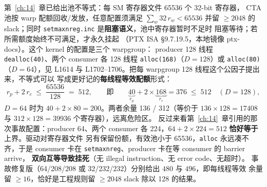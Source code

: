 第~\ref{ch:14}~章已给出池不等式：每 SM 寄存器文件 65536 个 32-bit 寄存器，
CTA 池按 warp 配额回收/发放，任意配置须满足
$\sum_{w} 32\,r_w < 65536$ 并留 $\ge 2048$ 的 slack；同时
\texttt{setmaxnreg.\allowbreak{}inc} 是\textbf{阻塞语义}，池中寄存器暂时不足时
阻塞等待；若所需额度始终不可满足，才永久挂起
（PTX ISA §9.7.19.5，本地镜像 ptx-docs）。这个 kernel 的配置是三个 warpgroup：
producer 128 线程 \texttt{dealloc(40)}、两个 consumer 各 128 线程
\texttt{alloc(168)}（$D{=}128$）或 \texttt{alloc(80)}（$D{=}64$），见
L1614 与 L1702--1706。把每 warpgroup 128 线程这个公因子提出来，不等式可以
写成更好记的\textbf{每线程等效配额}形式：
\begin{equation}
  r_p + 2\,r_c \;\le\; \frac{65536}{128} \;=\; 512 ,
  \qquad\text{即}\qquad
  \underbrace{40}_{r_p} + 2 \times \underbrace{168}_{r_c} = 376 \;\le\; 512
  \quad (D{=}128) ,
  \label{eq:18-pool}
\end{equation}
$D{=}64$ 时为 $40 + 2 \times 80 = 200$。两者余量 136 / 312（等价于
$136 \times 128 = 17408$ 与 $312 \times 128 = 39936$ 个寄存器），远离危险区。
反过来看第~\ref{ch:14}~章引用的那次事故配置：producer 64、两个 consumer
各 224，$64 + 2 \times 224 = 512$ \textbf{恰好等于}上界。驱动对寄存器文件
另有保留份额，有效池小于 65536，\texttt{alloc} 永远凑不齐，于是 consumer
卡在 \texttt{setmaxnreg}、producer 卡在等 consumer 的 barrier arrive，
\textbf{双向互等导致挂死}（无 illegal instruction、无 error code、无超时）。
事故修复版（64/208/208 或 32/232/232）分别给出 $480$ 与 $496$，即每线程等效
余量留 $\ge 16$，恰好是工程规则留 $\ge 2048$ slack 除以 128 的结果。

